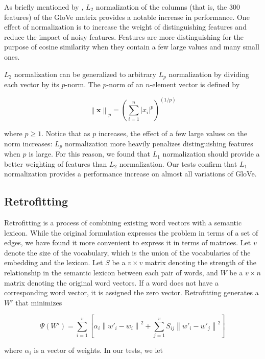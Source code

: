 \documentclass[11pt]{article}
\begin{document}
As briefly mentioned by , $L_2$ normalization of
the columns (that is, the 300 features) of the GloVe matrix provides a notable
increase in performance. One effect of normalization is to increase the weight
of distinguishing features and reduce the impact of noisy features.  Features
are more distinguishing for the purpose of cosine similarity when they contain
a few large values and many small ones.

$L_2$ normalization can be generalized to arbitrary $L_p$ normalization by
dividing each vector by its $p$-norm. The $p$-norm of an $n$-element vector is
defined by

$$ \left\|\mathbf{x}\right\|_p
= \left(\sum_{i=1}^n \left|x_i\right|^p\right)^{(1/p)}$$

where $p \geq 1$. Notice that as $p$ increases, the effect of a few large values
on the norm increases: $L_p$ normalization more heavily penalizes
distinguishing features when $p$ is large. For this reason, we found that $L_1$
normalization should provide a better weighting of features than $L_2$
normalization.  Our tests confirm that $L_1$ normalization provides a
performance increase on almost all variations of GloVe.


\subsection{Retrofitting}

Retrofitting \cite{faruqui2015retrofitting} is a process of combining existing
word vectors with a semantic lexicon. While the original formulation expresses
the problem in terms of a set of edges, we have found it more convenient to
express it in terms of matrices. Let $v$ denote the size of the vocabulary,
which is the union of the vocabularies of the embedding and the lexicon. Let $S$ be
a $v \times v$ matrix denoting the strength of the relationship in the semantic lexicon
between each pair of words, and $W$ be a $v \times n$
matrix denoting the original word vectors. If a word does not have a
corresponding word vector, it is assigned the zero vector. Retrofitting
generates a $W'$ that minimizes

\begin{small}
$$
\Psi \left( W' \right) = \sum_{i=1}^v \left[
  \alpha_i \left\|  w'_i - w_i \right\| ^ 2
  + \sum_{j=1}^v S_{ij} \left\| w'_i - w'_j \right\| ^ 2
\right]
$$
\end{small}

where $\alpha_i$ is a vector of weights. In our tests, we let
\end{document}
